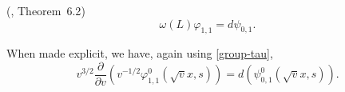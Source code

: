 \begin{theorem}(\cite{FMcoeff}, Theorem~6.2\label{Millson})\label{localholW}
\[ \omega(L) \varphi_{1,1} = d \psi_{0,1}.  \]
\end{theorem}

When made explicit, we have, again using \eqref{group-tau},
\begin{equation}
v^{3/2} \frac{\partial}{\partial v } \left(v^{-1/2} \varphi_{1,1}^0(\sqrt{v}x,s) \right)=  d
\left(\psi_{0,1}^0(\sqrt{v}x,s)\right).
\end{equation}


